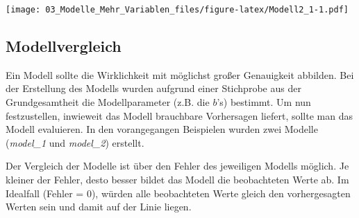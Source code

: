\documentclass[]{article}
\newenvironment{Shaded}{\begin{snugshade}}{\end{snugshade}}
\newcommand{\KeywordTok}[1]{\textcolor[rgb]{0.13,0.29,0.53}{\textbf{#1}}}
\newcommand{\DataTypeTok}[1]{\textcolor[rgb]{0.13,0.29,0.53}{#1}}
\newcommand{\DecValTok}[1]{\textcolor[rgb]{0.00,0.00,0.81}{#1}}
\newcommand{\StringTok}[1]{\textcolor[rgb]{0.31,0.60,0.02}{#1}}
\newcommand{\CommentTok}[1]{\textcolor[rgb]{0.56,0.35,0.01}{\textit{#1}}}
\newcommand{\OperatorTok}[1]{\textcolor[rgb]{0.81,0.36,0.00}{\textbf{#1}}}
\newcommand{\NormalTok}[1]{#1}
\begin{document}
\texttt{[image: 03\_Modelle\_Mehr\_Variablen\_files/figure-latex/Modell2\_1-1.pdf]}

\subsection*{Modellvergleich}\label{modellvergleich}

Ein Modell sollte die Wirklichkeit mit möglichst großer Genauigkeit
abbilden. Bei der Erstellung des Modells wurden aufgrund einer
Stichprobe aus der Grundgesamtheit die Modellparameter (z.B. die
\(b\)'s) bestimmt. Um nun festzustellen, inwieweit das Modell brauchbare
Vorhersagen liefert, sollte man das Modell evaluieren. In den
vorangegangen Beispielen wurden zwei Modelle (\emph{model\_1} und
\emph{model\_2}) erstellt.

Der Vergleich der Modelle ist über den Fehler des jeweiligen Modells
möglich. Je kleiner der Fehler, desto besser bildet das Modell die
beobachteten Werte ab. Im Idealfall (Fehler = 0), würden alle
beobachteten Werte gleich den vorhergesagten Werten sein und damit auf
der Linie liegen.

\begin{Shaded}
\end{Shaded}
\end{document}
